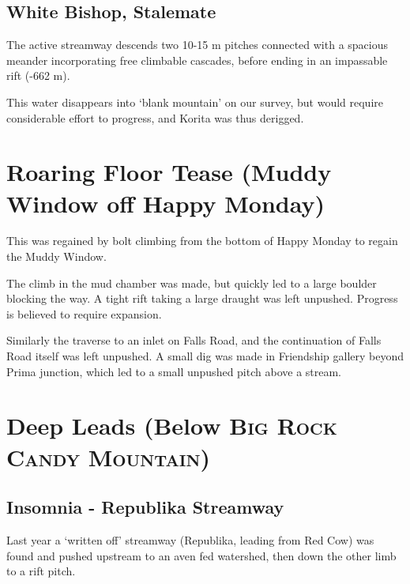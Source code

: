 \hypertarget{white-bishop-stalemate}{%
\subsection{White Bishop, Stalemate}\label{white-bishop-stalemate}}

The active streamway descends two 10-15 m pitches connected with a
spacious meander incorporating free climbable cascades, before ending in
an impassable rift (-662 m).

This water disappears into `blank mountain' on our survey, but would
require considerable effort to progress, and Korita was thus derigged.

\hypertarget{roaring-floor-tease-muddy-window-off-happy-monday}{%
\section{Roaring Floor Tease (Muddy Window off Happy
Monday)}\label{roaring-floor-tease-muddy-window-off-happy-monday}}

This was regained by bolt climbing from the bottom of Happy Monday to
regain the Muddy Window.

The climb in the mud chamber was made, but quickly led to a large
boulder blocking the way. A tight rift taking a large draught was left
unpushed. Progress is believed to require expansion.

Similarly the traverse to an inlet on Falls Road, and the continuation
of Falls Road itself was left unpushed. A small dig was made in
Friendship gallery beyond Prima junction, which led to a small unpushed
pitch above a stream.

\hypertarget{deep-leads-below}{%
\section{\texorpdfstring{Deep Leads (Below
\textsc{Big Rock Candy Mountain})}{Deep Leads (Below )}}\label{deep-leads-below}}

\hypertarget{insomnia---republika-streamway}{%
\subsection{Insomnia - Republika
Streamway}\label{insomnia---republika-streamway}}

Last year a `written off' streamway (Republika, leading from Red Cow)
was found and pushed upstream to an aven fed watershed, then down the
other limb to a rift pitch.

